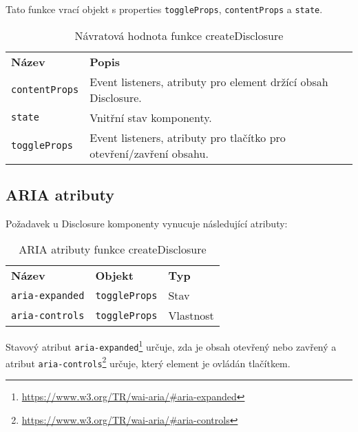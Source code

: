 Tato funkce vrací objekt s properties \texttt{toggleProps}, \texttt{contentProps} a \texttt{state}.

\begin{table}[ht]\label{table:disclosure-return}
    \begin{ctucolortab}
        \begin{tabularx}{\textwidth}{p{3cm} X}
            \bfseries Název       & \bfseries Popis                                                     \\\Midrule{}
            \texttt{contentProps} & Event listeners, atributy pro element držící obsah Disclosure.      \\
            \texttt{state}        & Vnitřní stav komponenty.                                            \\
            \texttt{toggleProps}  & Event listeners, atributy pro tlačítko pro otevření/zavření obsahu.
        \end{tabularx}
    \end{ctucolortab}
    \caption{Návratová hodnota funkce createDisclosure}
\end{table}

\subsection{ARIA atributy}

Požadavek \hyperref[ofr12]{} u Disclosure komponenty vynucuje následující atributy:

\begin{table}[ht]\label{table:disclosure-aria}
    \begin{ctucolortab}
        \begin{tabularx}{\textwidth}{X X X}
            \bfseries Název        & \bfseries Objekt     & \bfseries Typ \\\Midrule{}
            \texttt{aria-expanded} & \texttt{toggleProps} & Stav          \\
            \texttt{aria-controls} & \texttt{toggleProps} & Vlastnost
        \end{tabularx}
    \end{ctucolortab}
    \caption{ARIA atributy funkce createDisclosure}
\end{table}

Stavový atribut \texttt{aria-expanded}\footnote{\url{https://www.w3.org/TR/wai-aria/\#aria-expanded}} určuje, zda je obsah otevřený nebo zavřený a atribut \texttt{aria-controls}\footnote{\url{https://www.w3.org/TR/wai-aria/\#aria-controls}} určuje, který element je ovládán tlačítkem.

